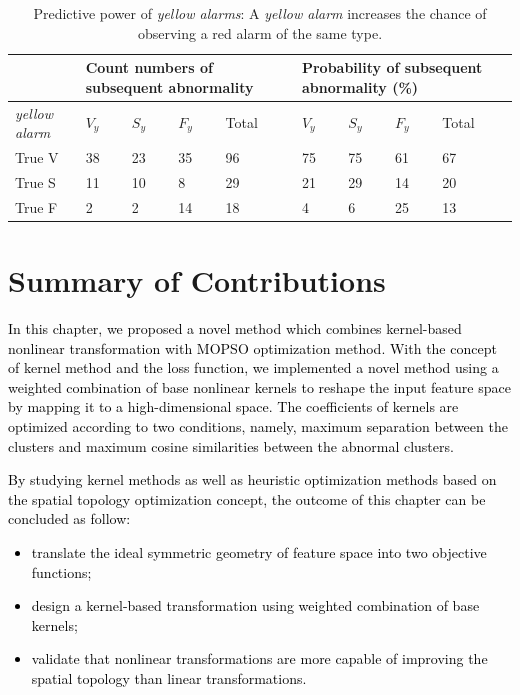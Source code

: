 \begin{table}
	\caption{Predictive power of \textit{yellow alarms}: A \textit{yellow alarm} increases the chance of observing a red alarm of the same type.}
	\centering
	\begin{tabular}{|m{6em}| m{2em}| m{2em}| m{2em} |m{2em}| m{2em}| m{2em}| m{2em}| m{2em}|}
		\hline
		& \multicolumn{4}{p{10em}|}{Count numbers of subsequent abnormality} &\multicolumn{4}{p{10em}|}{Probability of subsequent abnormality (\%)}  \\ 
		\hline 
		\textit{\textit{yellow alarm}} & $V_y$ & $S_y$ & $F_y$ & Total & $V_y$ & $S_y$ & $F_y$ & Total \\ 
		\hline 
		True V & 38 & 23 & 35& 96 & 75 & 75 & 61 & 67 \\ 
		\hline 
		True S & 11 & 10 & 8 & 29 & 21 & 29 & 14& 20 \\ 
		\hline 
		True F & 2 & 2 & 14 & 18 & 4 & 6 & 25 & 13 \\ 
		\hline 
	\end{tabular}%
	\label{table:pred_kernel}
\end{table}


\section{Summary of Contributions} 

\textcolor{black}{In this chapter, we proposed a novel method which combines kernel-based nonlinear transformation with MOPSO optimization method. With the concept of kernel method and the loss function, we implemented a novel method using a weighted combination of base nonlinear kernels to reshape the input feature space by mapping it to a high-dimensional space. The coefficients of kernels are optimized according to two conditions, namely, maximum separation between the clusters and maximum cosine similarities between the abnormal clusters.} \\
\textcolor{black}{By studying kernel methods as well as heuristic optimization methods based on the spatial topology optimization concept, the outcome of this chapter can be concluded as follow:\\
\begin{itemize}
	\item translate the ideal symmetric geometry of feature space into two objective functions;
	\item design a kernel-based transformation using weighted combination of base kernels;
	\item validate that nonlinear transformations are more capable of improving the spatial topology than linear transformations.
\end{itemize}}

